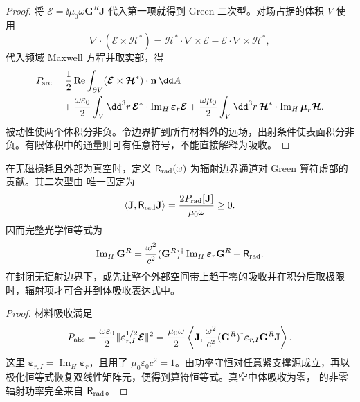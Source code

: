 \begin{proof}
将 $\boldsymbol{\mathcal E}=\ii\mu_0\omega\mathbf G^R\mathbf J$ 代入第一项就得到 Green 二次型。对场占据的体积 $V$ 使用
\begin{equation*}
 \nabla\cdot(\boldsymbol{\mathcal E}\times\boldsymbol{\mathcal H}^*)
 =\boldsymbol{\mathcal H}^*\cdot\nabla\times\boldsymbol{\mathcal E}
 -\boldsymbol{\mathcal E}\cdot\nabla\times\boldsymbol{\mathcal H}^*,
\end{equation*}
代入频域 Maxwell 方程并取实部，得
\begin{align*}
 P_{\rm src}
 &=\frac12\operatorname{Re}\int_{\partial V}
 (\boldsymbol{\mathcal E}\times\boldsymbol{\mathcal H}^*)\cdot\mathbf n\,\dd A\\
 &\quad+\frac{\omega\varepsilon_0}{2}\int_V\dd^3r\,
 \boldsymbol{\mathcal E}^*\cdot\operatorname{Im}_{H}\boldsymbol\varepsilon_r\boldsymbol{\mathcal E}
 +\frac{\omega\mu_0}{2}\int_V\dd^3r\,
 \boldsymbol{\mathcal H}^*\cdot\operatorname{Im}_{H}\boldsymbol\mu_r\boldsymbol{\mathcal H}.
\end{align*}
被动性使两个体积分非负。令边界扩到所有材料外的远场，出射条件使表面积分非负。有限体积中的通量则可有任意符号，不能直接解释为吸收。
\end{proof}

\begin{definition}
在无磁损耗且外部为真空时，定义 $\mathsf R_{\rm rad}(\omega)$ 为辐射边界通道对 Green 算符虚部的贡献。其二次型由 唯一固定为
\begin{equation}
 \langle\mathbf J,\mathsf R_{\rm rad}\mathbf J\rangle
 =\frac{2P_{\rm rad}[\mathbf J]}{\mu_0\omega}\ge0.
 \label{eq:feqo-radiative-spectral-operator}
\end{equation}
因而完整光学恒等式为
\begin{equation}
 \operatorname{Im}_{H}\mathbf G^R
 =\frac{\omega^2}{c^2}(\mathbf G^R)^\dagger
 \operatorname{Im}_{H}\boldsymbol\varepsilon_r\mathbf G^R
 +\mathsf R_{\rm rad}.
 \label{eq:feqo-open-green-optical-identity}
\end{equation}
在封闭无辐射边界下，或先让整个外部空间带上趋于零的吸收并在积分后取极限时，辐射项才可合并到体吸收表达式中。
\end{definition}

\begin{proof}
材料吸收满足
\begin{equation*}
 P_{\rm abs}=\frac{\omega\varepsilon_0}{2}\|\boldsymbol\varepsilon_{r,I}^{1/2}
 \boldsymbol{\mathcal E}\|^2
 =\frac{\mu_0\omega}{2}\left\langle\mathbf J,
 \frac{\omega^2}{c^2}(\mathbf G^R)^\dagger
 \boldsymbol\varepsilon_{r,I}\mathbf G^R\mathbf J\right\rangle.
\end{equation*}
这里 $\boldsymbol\varepsilon_{r,I}=\operatorname{Im}_{H}\boldsymbol\varepsilon_r$，且用了 $\mu_0\varepsilon_0c^2=1$。由功率守恒对任意紧支撑源成立，再以极化恒等式恢复双线性矩阵元，便得到算符恒等式。真空中体吸收为零， 的非零辐射功率完全来自 $\mathsf R_{\rm rad}$。
\end{proof}
